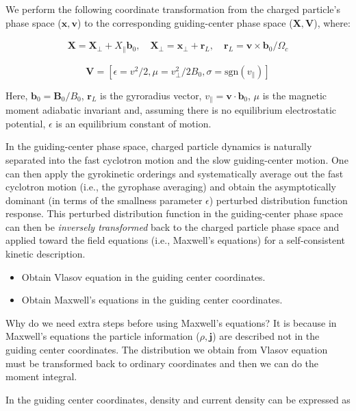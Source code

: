 \documentclass[
  notoc %
]{tufte-book}
\providecommand{\tightlist}{%
  \setlength{\itemsep}{0pt}\setlength{\parskip}{0pt}
}
\begin{document}
We perform the following coordinate transformation from the charged
particle's phase space (\(\mathbf{x},\mathbf{v}\)) to the corresponding
guiding-center phase space (\(\mathbf{X},\mathbf{V}\)), where:

\[
\begin{aligned}
\mathbf{X} = \mathbf{X}_\perp + X_\parallel \mathbf{b}_0,\quad \mathbf{X}_\perp = \mathbf{x}_\perp + \mathbf{r}_L,\quad \mathbf{r}_L = \mathbf{v}\times\mathbf{b}_0 / \Omega_c
\end{aligned}
\]

\[
\mathbf{V} = [\epsilon=v^2/2, \mu=v_\perp^2/2B_0, \sigma=\text{sgn}(v_\parallel)]
\]

Here, \(\mathbf{b}_0 = \mathbf{B}_0/B_0\), \(\mathbf{r}_L\) is the
gyroradius vector, \(v_\parallel=\mathbf{v}\cdot\mathbf{b}_0\), \(\mu\)
is the magnetic moment adiabatic invariant and, assuming there is no
equilibrium electrostatic potential, \(\epsilon\) is an equilibrium
constant of motion.

In the guiding-center phase space, charged particle dynamics is
naturally separated into the fast cyclotron motion and the slow
guiding-center motion. One can then apply the gyrokinetic orderings and
systematically average out the fast cyclotron motion (i.e., the
gyrophase averaging) and obtain the asymptotically dominant (in terms of
the smallness parameter \(\epsilon\)) perturbed distribution function
response. This perturbed distribution function in the guiding-center
phase space can then be \emph{inversely transformed} back to the charged
particle phase space and applied toward the field equations (i.e.,
Maxwell's equations) for a self-consistent kinetic description.

\begin{itemize}
\tightlist
\item
  Obtain Vlasov equation in the guiding center coordinates.
\item
  Obtain Maxwell's equations in the guiding center coordinates.
\end{itemize}

Why do we need extra steps before using Maxwell's equations? It is
because in Maxwell's equations the particle information
(\(\rho, \mathbf{j}\)) are described not in the guiding center
coordinates. The distribution we obtain from Vlasov equation must be
transformed back to ordinary coordinates and then we can do the moment
integral.

In the guiding center coordinates, density and current density can be
expressed as
\end{document}
